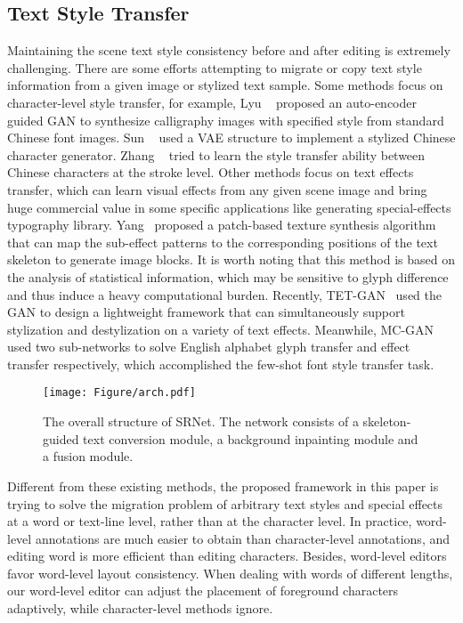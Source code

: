 \documentclass[sigconf]{acmart}
\begin{document}
\subsection{Text Style Transfer}
Maintaining the scene text style consistency before and after editing is extremely challenging. There are some efforts attempting to migrate or copy text style information from a given image or stylized text sample. Some methods focus on character-level style transfer, for example, Lyu  ~\cite{lyu2017auto} proposed an auto-encoder guided GAN to synthesize calligraphy images with specified style from standard Chinese font images. Sun  ~\cite{sun2017learning} used a VAE structure to implement a stylized Chinese character generator. Zhang  ~\cite{zhang2018separating} tried to learn the style transfer ability between Chinese characters at the stroke level. Other methods focus on text effects transfer, which can learn visual effects from any given scene image and bring huge commercial value in some specific applications like generating special-effects typography library. Yang  ~\cite{yang2017awesome,yang2018context}proposed a patch-based texture synthesis algorithm that can map the sub-effect patterns to the corresponding positions of the text skeleton to generate image blocks. It is worth noting that this method is based on the analysis of statistical information, which may be sensitive to glyph difference and thus induce a heavy computational burden. Recently, TET-GAN~\cite{yang2019tet} used the GAN to design a lightweight framework that can simultaneously support stylization and destylization on a variety of text effects. Meanwhile, MC-GAN~\cite{azadi2018multi} used two sub-networks to solve English alphabet glyph transfer and effect transfer respectively, which accomplished the few-shot font style transfer task.
\begin{figure*}[t]
    \centering
\texttt{[image: Figure/arch.pdf]}

\caption{The overall structure of SRNet. The network consists of a skeleton-guided text conversion module, a background inpainting module and a fusion module.}
\label{fig:arch}
\end{figure*}

Different from these existing methods, the proposed framework in this paper is trying to solve the migration problem of arbitrary text styles and special effects at a word or text-line level, rather than at the character level. In practice, word-level annotations are much easier to obtain than character-level annotations, and editing word is more efficient than editing characters. Besides, word-level editors favor word-level layout consistency. When dealing with words of different lengths, our word-level editor can adjust the placement of foreground characters adaptively, while character-level methods ignore.
\end{document}
